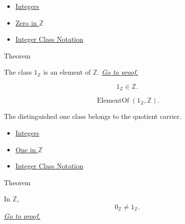 \begin{dependencies}
\begin{itemize}
  \item \hyperref[def:integers]{Integers}
  \item \hyperref[def:zero-in-z]{Zero in $\mathbb{Z}$}
  \item \hyperref[def:integer-class-notation]{Integer Class Notation}
\end{itemize}
\end{dependencies}

\begin{theorembox}{Theorem}
\begin{theorem}
\label{thm:one-is-an-integer}
The class $1_{\mathbb{Z}}$ is an element of $\mathbb{Z}$.
\hyperref[prf:one-is-an-integer]{\textit{Go to proof.}}
\end{theorem}
\end{theorembox}

\begin{remark*}
\[
1_{\mathbb{Z}}\in\mathbb{Z}.
\]
\end{remark*}

\begin{remark*}
\[
\operatorname{ElementOf}(1_{\mathbb{Z}},\mathbb{Z}).
\]
\end{remark*}

\begin{remark*}[Interpretation]
The distinguished one class belongs to the quotient carrier.
\end{remark*}

\begin{dependencies}
\begin{itemize}
  \item \hyperref[def:integers]{Integers
}
  \item \hyperref[def:one-in-z]{One in $\mathbb{Z}$}
  \item \hyperref[def:integer-class-notation]{Integer Class Notation}
\end{itemize}
\end{dependencies}

\begin{theorembox}{Theorem}
\begin{theorem}
\label{thm:zero-not-one-in-z}
In $\mathbb{Z}$,
\[
0_{\mathbb{Z}}\ne 1_{\mathbb{Z}}.
\]
\hyperref[prf:zero-not-one-in-z]{\textit{Go to proof.}}
\end{theorem}
\end{theorembox}


